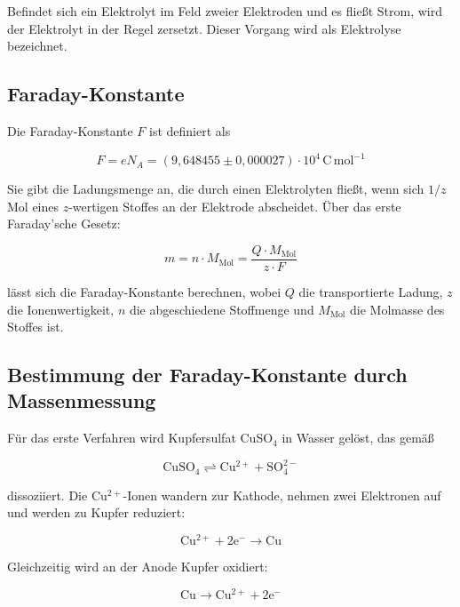 Befindet sich ein Elektrolyt im Feld zweier Elektroden und es fließt Strom, wird der Elektrolyt in der Regel zersetzt. Dieser Vorgang wird als Elektrolyse bezeichnet.

\subsection{Faraday-Konstante}

Die Faraday-Konstante $F$ ist definiert als

\begin{equation}
F = e N_A = (9,648455 \pm 0,000027) \cdot 10^4 \,\mathrm{C\,mol^{-1}}
\label{eq:faraday}
\end{equation}

Sie gibt die Ladungsmenge an, die durch einen Elektrolyten fließt, wenn sich $1/z$ Mol eines $z$-wertigen Stoffes an der Elektrode abscheidet. Über das erste Faraday’sche Gesetz:

\begin{equation}
m = n \cdot M_\mathrm{Mol} = \frac{Q \cdot M_\mathrm{Mol}}{z \cdot F}
\label{eq:first_faraday}
\end{equation}

lässt sich die Faraday-Konstante berechnen, wobei $Q$ die transportierte Ladung, $z$ die Ionenwertigkeit, $n$ die abgeschiedene Stoffmenge und $M_\mathrm{Mol}$ die Molmasse des Stoffes ist.

\subsection{Bestimmung der Faraday-Konstante durch Massenmessung}
\label{sc:Massenmessung}

Für das erste Verfahren wird Kupfersulfat CuSO$_4$ in Wasser gelöst, das gemäß

\begin{equation}
\mathrm{CuSO_4 \rightleftharpoons Cu^{2+} + SO_4^{2-}}
\label{eq:cu_dissoziation}
\end{equation}

dissoziiert. Die Cu$^{2+}$-Ionen wandern zur Kathode, nehmen zwei Elektronen auf und werden zu Kupfer reduziert:

\begin{equation}
\mathrm{Cu^{2+} + 2e^- \rightarrow Cu}
\label{eq:cu_reduktion}
\end{equation}

Gleichzeitig wird an der Anode Kupfer oxidiert:

\begin{equation}
\mathrm{Cu \rightarrow Cu^{2+} + 2e^-}
\label{eq:cu_oxidation}
\end{equation}

